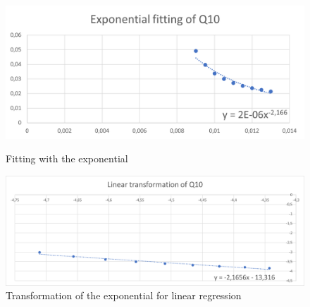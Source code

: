 \documentclass{article}
\begin{document}
                    \begin{figure}[htbp!]
                        \centering
                        \begin{minipage}[c]{.40\textwidth}
                            \centering
                            \includegraphics[width=\textwidth]{./data_analysis/Q10_exp_lambda.png}
                            \caption{Fitting with the exponential}
                            \label{fig:Q10_exp_lambda}
                        \end{minipage}
                        \hspace{10mm}
                        \begin{minipage}[c]{.40\textwidth}
                            \centering
                            \includegraphics[width=\textwidth]{./data_analysis/Q10_lin_lambda.png}
                            \caption{Transformation of the exponential for linear regression}
                            \label{fig:Q10_lin_lambda}
                        \end{minipage}
                    \end{figure}
                    
\end{document}
